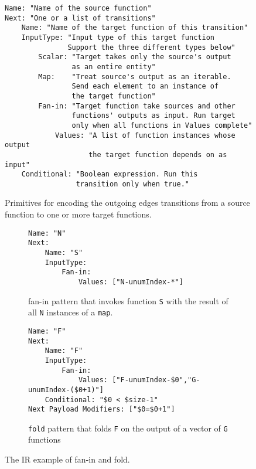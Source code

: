 \begin{figure}[t!]
    \centering
    \begin{verbatim}
Name: "Name of the source function"
Next: "One or a list of transitions"
    Name: "Name of the target function of this transition"
    InputType: "Input type of this target function
               Support the three different types below"
        Scalar: "Target takes only the source's output
                as an entire entity"
        Map:    "Treat source's output as an iterable.
                Send each element to an instance of
                the target function"
        Fan-in: "Target function take sources and other
                functions' outputs as input. Run target
                only when all functions in Values complete"
            Values: "A list of function instances whose output
                    the target function depends on as input"
    Conditional: "Boolean expression. Run this
                 transition only when true."

    \end{verbatim}
    \caption{Primitives for encoding the outgoing edges transitions from a
    source function to one or more target functions.}
    \label{fig:ir-schema}
\end{figure}



\begin{figure}[t!]
    \centering
    \begin{subfigure}[t]{\columnwidth}
        \centering
        \begin{verbatim}
Name: "N"
Next:
    Name: "S"
    InputType: 
        Fan-in:
            Values: ["N-unumIndex-*"]
        \end{verbatim}
        \caption{fan-in pattern that invokes function \texttt{S} with the
            result of all \texttt{N} instances of a \texttt{map}.}
        \label{fig:gadget-examples-fanin}
    \end{subfigure}

    \begin{subfigure}[t]{\columnwidth}
        \centering
        \begin{verbatim}
Name: "F"
Next:
    Name: "F"
    InputType:
        Fan-in:
            Values: ["F-unumIndex-$0","G-unumIndex-($0+1)"]
    Conditional: "$0 < $size-1"
Next Payload Modifiers: ["$0=$0+1"]
        \end{verbatim}
        \caption{\texttt{fold} pattern that folds \texttt{F} on the output of
        a vector of \texttt{G} functions}
        \label{fig:gadget-examples-fold}
    \end{subfigure}

    \caption{The \name{} IR example of fan-in and fold.}
    \label{fig:ir-examples}
\end{figure}

